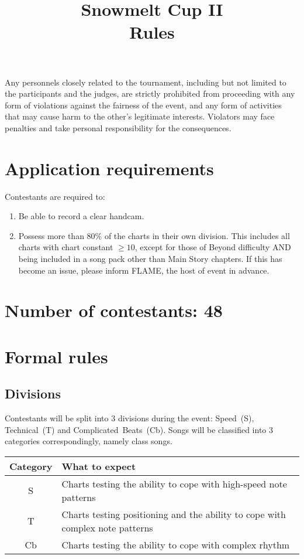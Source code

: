 \documentclass{article}
\title{{Snowmelt Cup II}\\{\Huge Rules}}
\author{}
\date{}
\newcommand{\alert}[1]{{\color{red} #1}}
\begin{document}
\maketitle
\alert{
	Any personnels
	closely related to the tournament,
	including but not limited to
	the participants and the judges,
	are strictly prohibited from
	proceeding with any form of
	violations against the fairness of the event,
	and any form of activities that
	may cause harm to the other's legitimate interests.
	Violators may face penalties
	and take personal responsibility for the consequences.
}

\section{Application requirements} \label{sec:application-requirements}

Contestants are required to:

\begin{enumerate}
	\item Be able to record a clear handcam.
	\item Possess more than 80\% of the charts
	      in their own division.
	      This includes all charts with
	      chart constant $\geq 10$,
	      except for those of Beyond difficulty
	      AND being included in a song pack other than
	      Main Story chapters.
	      If this has become an issue,
	      please inform FLAME, the host of event in advance.
\end{enumerate}

\section{Number of contestants: 48}

\section{Formal rules}

\subsection{Divisions}

Contestants will be split into 3 divisions during the event:
Speed~(S), Technical~(T) and Complicated~Beats~(Cb).
Songs will be classified
into 3 categories correspondingly,
namely class songs.

\begin{table}[!htbp]
	\centering
	\begin{tabular}{cl}
		\hline
		Category & What to expect                                                                \\ \hline
		S        & Charts testing the ability to cope with high-speed note patterns              \\
		T        & Charts testing positioning and the ability to cope with complex note patterns \\
		Cb       & Charts testing the ability to cope with complex rhythm                        \\ \hline
	\end{tabular}
\end{table}
\end{document}
